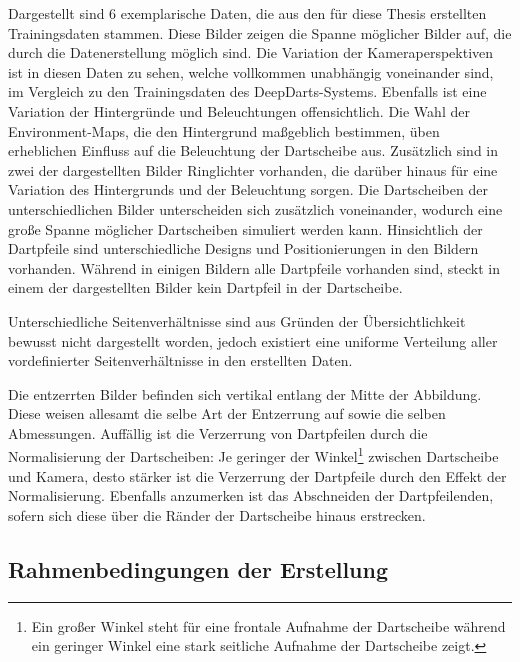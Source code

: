 Dargestellt sind 6 exemplarische Daten, die aus den für diese Thesis erstellten Trainingsdaten stammen. Diese Bilder zeigen die Spanne möglicher Bilder auf, die durch die Datenerstellung möglich sind. Die Variation der Kameraperspektiven ist in diesen Daten zu sehen, welche vollkommen unabhängig voneinander sind, im Vergleich zu den Trainingsdaten des DeepDarts-Systems. Ebenfalls ist eine Variation der Hintergründe und Beleuchtungen offensichtlich. Die Wahl der Environment-Maps, die den Hintergrund maßgeblich bestimmen, üben erheblichen Einfluss auf die Beleuchtung der Dartscheibe aus. Zusätzlich sind in zwei der dargestellten Bilder Ringlichter vorhanden, die darüber hinaus für eine Variation des Hintergrunds und der Beleuchtung sorgen. Die Dartscheiben der unterschiedlichen Bilder unterscheiden sich zusätzlich voneinander, wodurch eine große Spanne möglicher Dartscheiben simuliert werden kann. Hinsichtlich der Dartpfeile sind unterschiedliche Designs und Positionierungen in den Bildern vorhanden. Während in einigen Bildern alle Dartpfeile vorhanden sind, steckt in einem der dargestellten Bilder kein Dartpfeil in der Dartscheibe.

Unterschiedliche Seitenverhältnisse sind aus Gründen der Übersichtlichkeit bewusst nicht dargestellt worden, jedoch existiert eine uniforme Verteilung aller vordefinierter Seitenverhältnisse in den erstellten Daten.

Die entzerrten Bilder befinden sich vertikal entlang der Mitte der Abbildung. Diese weisen allesamt die selbe Art der Entzerrung auf sowie die selben Abmessungen. Auffällig ist die Verzerrung von Dartpfeilen durch die Normalisierung der Dartscheiben: Je geringer der Winkel\footnote{Ein großer Winkel steht für eine frontale Aufnahme der Dartscheibe während ein geringer Winkel eine stark seitliche Aufnahme der Dartscheibe zeigt.} zwischen Dartscheibe und Kamera, desto stärker ist die Verzerrung der Dartpfeile durch den Effekt der Normalisierung. Ebenfalls anzumerken ist das Abschneiden der Dartpfeilenden, sofern sich diese über die Ränder der Dartscheibe hinaus erstrecken.

\subsection{Rahmenbedingungen der Erstellung}  %
\label{sec:render_info}

